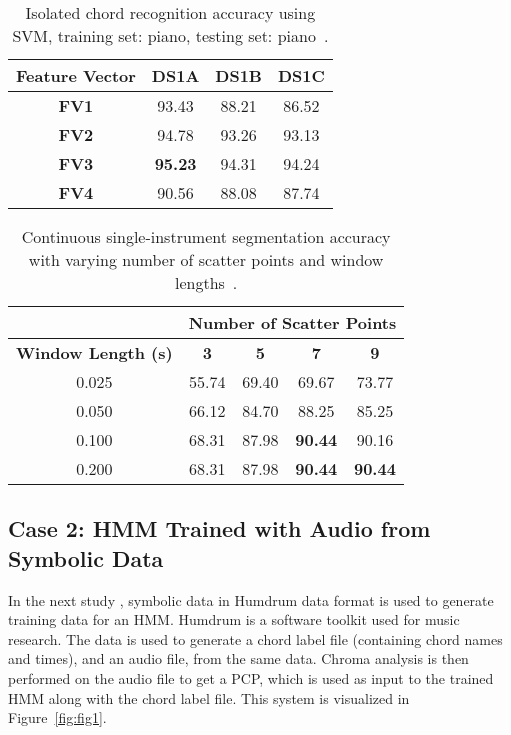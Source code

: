 \documentclass{sig-alternate}
\begin{document}
\begin{table}
\centering
\begin{tabular}{|c|c|c|c|} \hline
\textbf{Feature Vector} & \textbf{DS1A} & \textbf{DS1B} & \textbf{DS1C} \\ \hline
\textbf{FV1} & 93.43 & 88.21 & 86.52 \\ \hline
\textbf{FV2} & 94.78 & 93.26 & 93.13 \\ \hline
\textbf{FV3} & \textbf{95.23} & 94.31 & 94.24 \\ \hline
\textbf{FV4} & 90.56 & 88.08 & 87.74 \\ \hline
\end{tabular}
\caption{Isolated chord recognition accuracy using SVM, training set: piano, testing set: piano~\cite{Morman:2006}.}
\label{tab:tab7}
\end{table}

\begin{table}
\centering
\begin{tabular}{|c|c|c|c|c|} \hline
&\multicolumn{4}{|c|}{\textbf{Number of Scatter Points}} \\ \hline
\textbf{Window Length (s)} & \textbf{3} & \textbf{5} & \textbf{7} & \textbf{9} \\ \hline
0.025 & 55.74 & 69.40 & 69.67 & 73.77 \\ \hline
0.050 & 66.12 & 84.70 & 88.25 & 85.25 \\ \hline
0.100 & 68.31 & 87.98 & \textbf{90.44} & 90.16 \\ \hline
0.200 & 68.31 & 87.98 & \textbf{90.44} & \textbf{90.44} \\ \hline
\end{tabular}
\caption{Continuous single-instrument segmentation accuracy with varying number of scatter points and window lengths~\cite{Morman:2006}.}
\label{tab:tab8}
\end{table}

\subsection{Case 2: HMM Trained with Audio from Symbolic Data}

In the next study \cite{Lee:2006}, symbolic data in Humdrum data format is used to generate training data for an HMM. Humdrum is a software toolkit used for music research. The data is used to generate a chord label file (containing chord names and times), and an audio file, from the same data. Chroma analysis is then performed on the audio file to get a PCP, which is used as input to the trained HMM along with the chord label file. This system is visualized in Figure~\ref{fig:fig1}.
\end{document}
